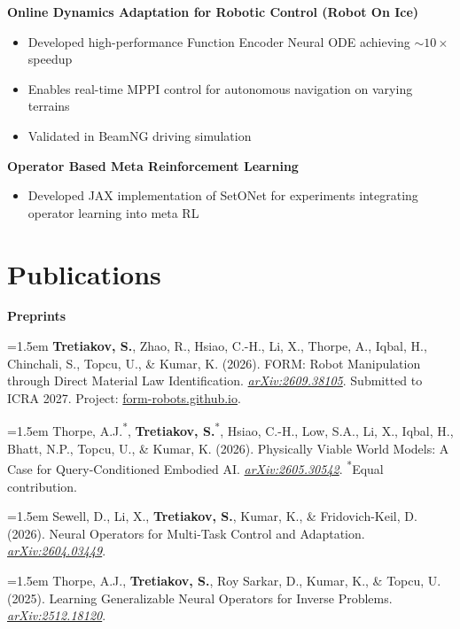 \documentclass[11pt,letterpaper]{article}
\newcommand{\projecthead}[1]{%
    \vspace{5pt}\textbf{#1}\par\vspace{2pt}
}
\newcommand{\pubentry}[1]{%
    {\interlinepenalty=10000 \hangindent=1.5em\hangafter=1 #1\par}\vspace{2pt}
}
\begin{document}
\projecthead{Online Dynamics Adaptation for Robotic Control (Robot On Ice)}
\begin{itemize}
    \item Developed high-performance Function Encoder Neural ODE achieving ${\sim}10\times$ speedup
    \item Enables real-time MPPI control for autonomous navigation on varying terrains
    \item Validated in BeamNG driving simulation
\end{itemize}

\projecthead{Operator Based Meta Reinforcement Learning}
\begin{itemize}
    \item Developed JAX implementation of SetONet for experiments integrating operator learning into meta RL
\end{itemize}

\section{Publications}

\textbf{Preprints}
\vspace{4pt}

\pubentry{\textbf{Tretiakov, S.}, Zhao, R., Hsiao, C.-H., Li, X., Thorpe, A., Iqbal, H., Chinchali, S., Topcu, U., \& Kumar, K. (2026). FORM: Robot Manipulation through Direct Material Law Identification. \textit{\href{https://arxiv.org/abs/2609.38105}{arXiv:2609.38105}}. Submitted to ICRA 2027. Project: \href{https://form-robots.github.io}{form-robots.github.io}.}

\pubentry{Thorpe, A.J.\textsuperscript{*}, \textbf{Tretiakov, S.}\textsuperscript{*}, Hsiao, C.-H., Low, S.A., Li, X., Iqbal, H., Bhatt, N.P., Topcu, U., \& Kumar, K. (2026). Physically Viable World Models: A Case for Query-Conditioned Embodied AI. \textit{\href{https://arxiv.org/abs/2605.30542}{arXiv:2605.30542}}. \textsuperscript{*}Equal contribution.}

\pubentry{Sewell, D., Li, X., \textbf{Tretiakov, S.}, Kumar, K., \& Fridovich-Keil, D. (2026). Neural Operators for Multi-Task Control and Adaptation. \textit{\href{https://arxiv.org/abs/2604.03449}{arXiv:2604.03449}}.}

\pubentry{Thorpe, A.J., \textbf{Tretiakov, S.}, Roy Sarkar, D., Kumar, K., \& Topcu, U. (2025). Learning Generalizable Neural Operators for Inverse Problems. \textit{\href{https://arxiv.org/abs/2512.18120}{arXiv:2512.18120}}.}
\end{document}
